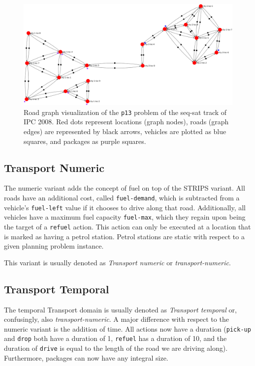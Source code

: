 \begin{figure}[tbp]
\begin{center}
\includegraphics[width=1.0\textwidth]{../img/ipc08_seq-sat_p13_land2}
\end{center}
\caption[Visualization of the \texttt{p13} problem of sequential Transport from IPC 2008.]{Road graph visualization of the \texttt{p13} problem of the seq-sat track of IPC 2008. Red dots represent locations (graph nodes), roads (graph edges) are represented by black arrows, vehicles are plotted as blue squares, and packages as purple squares.}
\label{fig:ipc08_seq-sat_p13}
\end{figure}

\subsection{Transport Numeric}\label{transport-numeric}

The numeric variant adds the concept of fuel on top of the STRIPS variant.
All roads have an additional cost, called \verb+fuel-demand+, which is
subtracted from a vehicle's \verb+fuel-left+ value if it chooses to drive along that road.
Additionally, all vehicles have a maximum fuel capacity \verb+fuel-max+,
which they regain upon being the target of a \verb+refuel+ action. This action can only
be executed at a location that is marked as having a petrol station. Petrol stations
are static with respect to a given planning problem instance.

This variant is usually denoted as \textit{Transport numeric} or \textit{transport-numeric}.

\subsection{Transport Temporal}\label{transport-temporal}

The temporal Transport domain is usually denoted as \textit{Transport temporal} or, confusingly,
also \textit{transport-numeric}. A major difference with respect to the numeric variant is
the addition of time. All actions now have a duration (\verb+pick-up+ and \verb+drop+ both have a
duration of 1, \verb+refuel+ has a duration of 10, and the duration of \verb+drive+ is
equal to the length of the road we are driving along). Furthermore, packages can now have any integral size.


